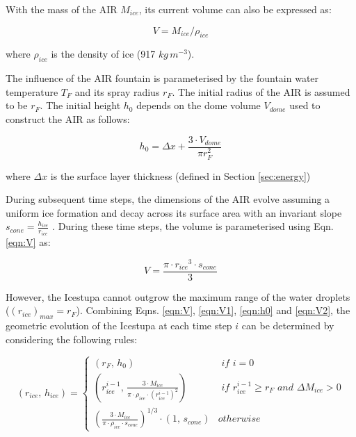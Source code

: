 \documentclass[utf8]{frontiersSCNS} %
\begin{document}
With the mass of the AIR $M_{ice}$, its current volume can also be expressed as:

\begin{equation} V = M_{ice} /\rho_{ice} \label{eqn:V1} \end{equation}

where $\rho_{ice}$ is the density of ice (917 $kg\, m^{-3}$).


The influence of the AIR fountain is parameterised by the fountain water temperature $T_{F}$ and its spray radius $r_F$.
The initial radius of the AIR is assumed to be $r_F$. The initial height $h_0$ depends on the dome volume $V_{dome}$
used to construct the AIR as follows:

\begin{equation}
	h_{0} =  \Delta x + \frac{3 \cdot V_{dome}}{\pi r_F^2 }
	\label{eqn:h0}
\end{equation}

where $\Delta x$ is the surface layer thickness (defined in Section \ref{sec:energy})

During subsequent time steps, the dimensions of the AIR evolve assuming a uniform ice formation and decay across its
surface area with an invariant slope $s_{cone} = \frac{h_{ice}}{r_{ice}}$ .  During these time steps, the volume is
parameterised using Eqn. \ref{eqn:V} as:

\begin{equation} V = \frac{\pi \cdot {r_{ice}}^3
		\cdot s_{cone}}{3} \label{eqn:V2} \end{equation}

However, the Icestupa cannot outgrow the maximum range of the water droplets ($(r_{ice})_{max} = r_{F}$). Combining
Eqns. \ref{eqn:V},  \ref{eqn:V1}, \ref{eqn:h0} and \ref{eqn:V2}, the geometric evolution of the Icestupa at each time
step $i$ can be determined by considering the following rules:

\begin{equation} (r_{ice},\, h_{ice}) = \left\{ \begin{array}{ll} (r_F ,\, h_0)                                                                        & \textit{ if } i=0 \\
             (r_{ice}^{i-1},\, \frac{3 \cdot M_{ice}}{\pi \cdot \rho_{ice} \cdot {(r_{ice}^{i-1})}^2}) & \textit{ if }
             r_{ice}^{i-1} \geq r_{F} \textit{ and } \Delta M_{ice} > 0                                                    \\ (\frac{3 \cdot M_{ice}}{\pi \cdot \rho_{ice} \cdot s_{cone}})^{1/3} \cdot (1,\,  s_{cone}) &
             otherwise\end{array} \right.  \label{eqn:A2} \end{equation}
\end{document}

